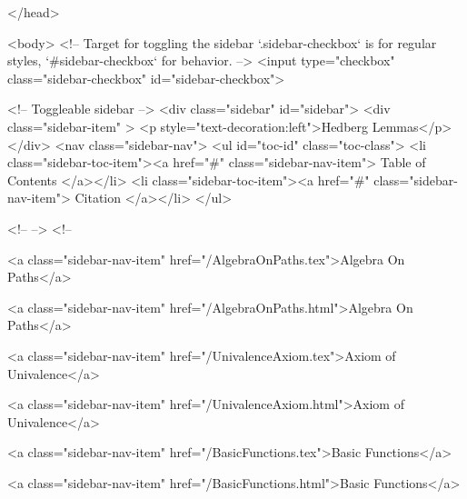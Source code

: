   
</head>




  <body>
    <!-- Target for toggling the sidebar `.sidebar-checkbox` is for regular
     styles, `#sidebar-checkbox` for behavior. -->
<input type="checkbox" class="sidebar-checkbox" id="sidebar-checkbox">

<!-- Toggleable sidebar -->
<div class="sidebar" id="sidebar">
  <div class="sidebar-item" >
    <p style="text-decoration:left">Hedberg Lemmas</p>
  </div>
  <nav class="sidebar-nav">
    <ul id="toc-id" class="toc-class">
  <li class="sidebar-toc-item"><a href="#" class="sidebar-nav-item"> Table of Contents </a></li>
  <li class="sidebar-toc-item"><a href="#" class="sidebar-nav-item"> Citation </a></li>
</ul>


    <!--  -->
    <!-- 
      
    
      
    
      
    
      
        
      
    
      
        
          <a class="sidebar-nav-item" href="/AlgebraOnPaths.tex">Algebra On Paths</a>
        
      
    
      
        
          <a class="sidebar-nav-item" href="/AlgebraOnPaths.html">Algebra On Paths</a>
        
      
    
      
        
          <a class="sidebar-nav-item" href="/UnivalenceAxiom.tex">Axiom of Univalence</a>
        
      
    
      
        
          <a class="sidebar-nav-item" href="/UnivalenceAxiom.html">Axiom of Univalence</a>
        
      
    
      
        
          <a class="sidebar-nav-item" href="/BasicFunctions.tex">Basic Functions</a>
        
      
    
      
        
          <a class="sidebar-nav-item" href="/BasicFunctions.html">Basic Functions</a>
        
      
    
      
        
